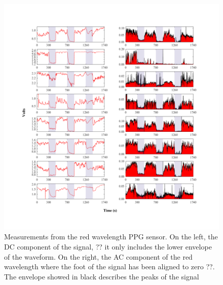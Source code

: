 \begin{figure}[!htbp]
	\centering
	\includegraphics[width=\textwidth,keepaspectratio,trim={1cm 0cm 0cm 0 cm},clip]{figure18}    
	\caption[PPG red wavelength measurments AC and DC components]{Measurements from the red wavelength PPG sensor. On the left, the DC component of the signal, ?? it only includes the lower envelope of the waveform. On the right, the AC component of the red wavelength where the foot of the signal has been aligned to zero ??. The envelope showed in black describes the peaks of the signal}
	\label{fig:RED PPG}
\end{figure}

